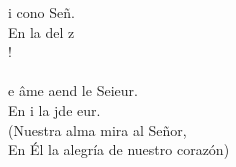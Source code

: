 \begin{cancion}%
	i cono Señ.  \\
	En  la del z\\
	!   \\
\jump\\
	e âme aend le Seieur.\\
	En i la jde eur.\\
(Nuestra alma mira al Señor,\\
En Él la alegría de nuestro corazón)\\
\end{cancion}%
